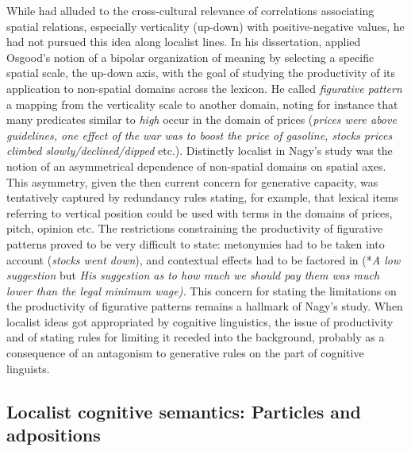 \documentclass[english,output=paper,colorlinks,citecolor=brown]{../langscibook}
\begin{document}
While \citet{Osgood1952} had alluded to the cross-cultural relevance of correlations associating spatial relations, especially verticality (up-down) with positive-negative values, he had not pursued this idea along localist lines. In his dissertation, \citet{Nagy1974} applied Osgood’s notion of a bipolar organization of meaning by selecting a specific spatial scale, the up-down axis, with the goal of studying the productivity of its application to non-spatial domains across the lexicon. He called \textit{figurative pattern} a mapping from the verticality scale to another domain, noting for instance that many predicates similar to \textit{high} occur in the domain of prices (\textit{prices were above guidelines, one effect of the war was to boost the price of gasoline, stocks prices climbed slowly\slash declined\slash dipped} etc.). Distinctly localist in Nagy’s study was the notion of an asymmetrical dependence of non-spatial domains on spatial axes. This asymmetry, given the then current concern for generative capacity, was tentatively captured by redundancy rules stating, for example, that lexical items referring to vertical position could be used with terms in the domains of prices, pitch, opinion etc. The restrictions constraining the productivity of figurative patterns proved to be very difficult to state: metonymies had to be taken into account (\textit{stocks went down}), and contextual effects had to be factored in (*\textit{A low suggestion} but \textit{His suggestion as to how much we should pay them was much lower than the legal minimum wage).} This concern for stating the limitations on the productivity of figurative patterns remains a hallmark of Nagy’s study. When localist ideas got appropriated by cognitive linguistics, the issue of productivity and of stating rules for limiting it receded into the background, probably as a consequence of an antagonism to generative rules on the part of cognitive linguists. 

\subsection{Localist cognitive semantics: Particles and adpositions}
\end{document}
